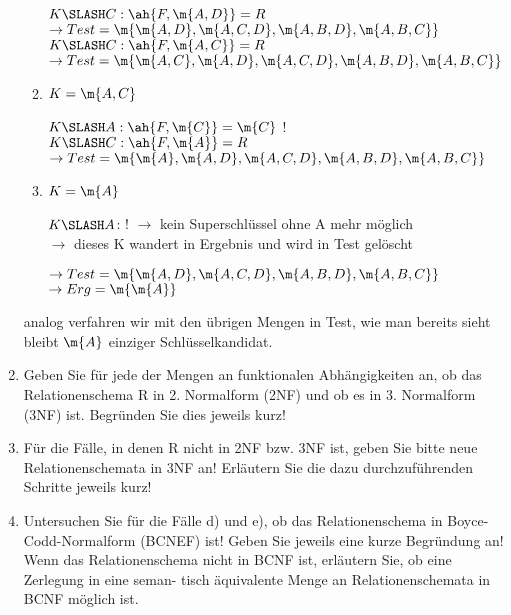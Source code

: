 \documentclass{bschlangaul-aufgabe}
\begin{document}
\begin{enumerate}
\begin{liAntwort}
\begin{enumerate}
$K \SLASH C: \ah{F, \m{A, D}} = R$\\
$\rightarrow Test = \m{\m{A, D}, \m{A, C, D}, \m{A, B, D}, \m{A, B, C}}$ \\

$K \SLASH C: \ah{F, \m{A, C}} = R$\\
$\rightarrow Test = \m{\m{A, C}, \m{A, D}, \m{A, C, D}, \m{A, B, D}, \m{A, B, C}}$ \\


\item $K = \m{A, C}$

$K \SLASH A: \ah{F, \m{C}} = \m{C}$ !\\

$K \SLASH C: \ah{F, \m{A}} = R$\\
$\rightarrow Test = \m{\m{A}, \m{A, D}, \m{A, C, D}, \m{A, B, D}, \m{A, B, C}}$ \\


\item $K = \m{A}$

$K \SLASH A$: ! $\rightarrow$ kein Superschlüssel ohne A mehr möglich\\
$\rightarrow$ dieses K wandert in Ergebnis und wird in Test gelöscht

$\rightarrow Test = \m{\m{A, D}, \m{A, C, D}, \m{A, B, D}, \m{A, B, C}}$ \\
$\rightarrow Erg = \m{\m{A}}$ \\
\end{enumerate}

analog verfahren wir mit den übrigen Mengen in Test, wie man bereits
sieht bleibt $\m{A}$ einziger Schlüsselkandidat.

\end{liAntwort}

\item Geben Sie für jede der Mengen an funktionalen Abhängigkeiten an,
ob das Relationenschema R in 2. Normalform (2NF) und ob es in 3.
Normalform (3NF) ist. Begründen Sie dies jeweils kurz!

\item Für die Fälle, in denen R nicht in 2NF bzw. 3NF ist, geben Sie
bitte neue Relationenschemata in 3NF an! Erläutern Sie die dazu
durchzuführenden Schritte jeweils kurz!

\item Untersuchen Sie für die Fälle d) und e), ob das Relationenschema
in Boyce-Codd-Normalform (BCNEF) ist! Geben Sie jeweils eine kurze
Begründung an! Wenn das Relationenschema nicht in BCNF ist, erläutern
Sie, ob eine Zerlegung in eine seman- tisch äquivalente Menge an
Relationenschemata in BCNF möglich ist.
\end{enumerate}
\end{document}

